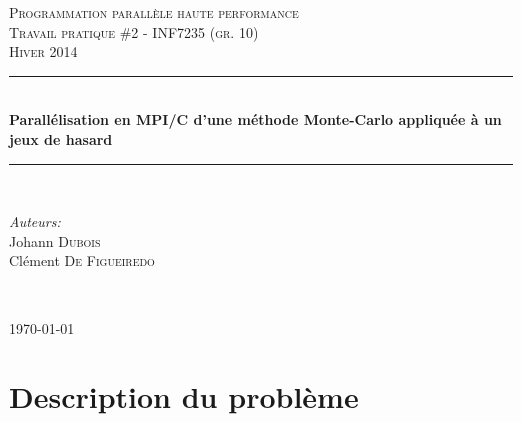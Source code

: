 \documentclass[a4paper,12pt]{article}
\begin{document}


\begin{titlepage}

\newcommand{\HRule}{\rule{\linewidth}{0.5mm}}

\begin{center}

\textsc{\LARGE Programmation parallèle haute performance\\[1.5cm] 
\textsc{\Large Travail pratique \#2 - INF7235 (gr. 10)}}\\[0.5cm]
\textsc{\large Hiver 2014}\\[0.5cm] 

\HRule \\[0.4cm]
{ \huge \bfseries Parallélisation en MPI/C d'une méthode Monte-Carlo appliquée à un jeux de hasard }\\[0.4cm] %
\HRule \\[1.5cm]

\end{center}


\begin{minipage}{0.4\textwidth}
\begin{flushleft} \large
\emph{Auteurs:}\\
Johann \textsc{Dubois} %
\\
Clément \textsc{De Figueiredo}
\end{flushleft}
\end{minipage}

~~\\

\begin{center}
{\large \today}\\[3cm] %

\vfill

\end{center}

\end{titlepage}
\newpage %

\tableofcontents %


\renewcommand\thesection{\Roman{section}}

\newpage %


\section{Description du problème}
\end{document}
